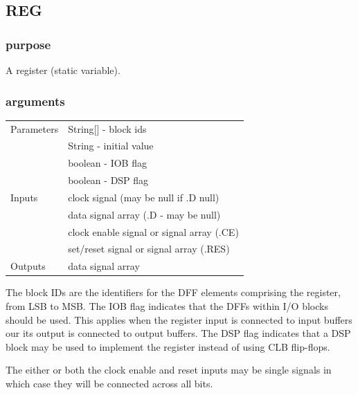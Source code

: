         \subsection{REG}

            \subsubsection{purpose}
            
                A register (static variable).

            \subsubsection{arguments}
            
                \begin{tabular}{| l | l |}
                \hline
                Parameters  & String[] - block ids \\
                            & String - initial value \\
                            & boolean - IOB flag \\
                            & boolean - DSP flag \\
                \hline
                Inputs      & clock signal (may be null if .D null) \\
                            & data signal array (.D - may be null) \\
                            & clock enable signal or signal array (.CE) \\
                            & set/reset signal or signal array (.RES) \\
                \hline
                Outputs     & data signal array \\
                \hline
                \end{tabular}
                
                The block IDs are the identifiers for the DFF elements comprising
                the register, from LSB to MSB. The IOB flag indicates that the DFFs
                within I/O blocks should be used. This applies when the register
                input is connected to input buffers our its output is connected to
                output buffers. The DSP flag indicates that a DSP block may be used
                to implement the register instead of using CLB flip-flops.
                
                The either or both the clock enable and reset inputs may be
                single signals in which case they will be connected across all
                bits.

